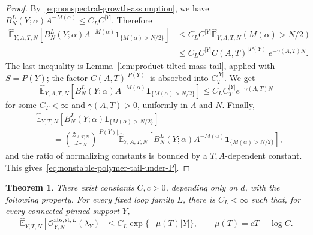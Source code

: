 \documentclass[11pt,a4paper,reqno]{amsart}
\newtheorem{theorem}{Theorem}[section]
\theoremstyle{definition}
\theoremstyle{remark}
\newcommand\E{{\mathbb E}}
\newcommand\Pbb{{\mathbb{P}}}
\begin{document}
\begin{proof}
By~\eqref{eq:nonspectral-growth-assumption}, we have $B_N^L(Y;\alpha)A^{-M(\alpha)}\le C_LC^{|Y|}.$ Therefore
\[
\begin{split}
\widehat\E_{Y,A,T,N}\left[B_N^L(Y;\alpha)A^{-M(\alpha)}\mathbf 1_{\{M(\alpha)>N/2\}}\right] &\le C_LC^{|Y|} \widehat\Pbb_{Y,A,T,N}\left(M(\alpha)>N/2\right)  \\
&\le C_LC^{|Y|}C(A,T)^{|P(Y)|}e^{-\gamma(A,T)N}.
\end{split}
\]
The last inequality is Lemma~\ref{lem:product-tilted-mass-tail}, applied with $S=P(Y)$; the factor $C(A,T)^{|P(Y)|}$ is absorbed into $C_T^{|Y|}$. We get
\[
\widehat\E_{Y,A,T,N}\left[B_N^L(Y;\alpha)A^{-M(\alpha)}\mathbf 1_{\{M(\alpha)>N/2\}}\right]\le C_L C_T^{|Y|}e^{-\gamma(A,T)N}
\]
for some $C_T<\infty$ and $\gamma(A,T)>0$, uniformly in $\Lambda$ and $N$. Finally,
\begin{align*}
&\widehat\E_{Y,T,N}\left[
B_N^L(Y;\alpha)\mathbf 1_{\{M(\alpha)>N/2\}}
\right]\\
&\qquad=
\left(\frac{\mathcal Z_{A,T,N}}{\mathcal Z_{T,N}}\right)^{|P(Y)|}
\widehat\E_{Y,A,T,N}\left[
B_N^L(Y;\alpha)A^{-M(\alpha)}
\mathbf 1_{\{M(\alpha)>N/2\}}
\right],
\end{align*}
and the ratio of normalizing constants is bounded by a $T,A$-dependent constant.  This gives~\eqref{eq:nonstable-polymer-tail-under-P}.
\end{proof}

\begin{theorem}
\label{thm:stable-hk-block}
There exist constants $C,c>0$, depending only on $d$, with the following property.  For every fixed loop family $L$, there is $C_L<\infty$ such that, for every connected pinned support $Y$,
\begin{equation}
\label{eq:stable-hk-block}
\widehat\E_{Y,T,N}\left[
\mathcal O_{Y,N}^{\mathrm{abs},\mathrm{st},L}(\lambda_Y)
\right]
\le
C_L\exp\{-\mu(T)|Y|\},
\qquad
\mu(T)=cT-\log C .
\end{equation}

\end{theorem}
\end{document}
